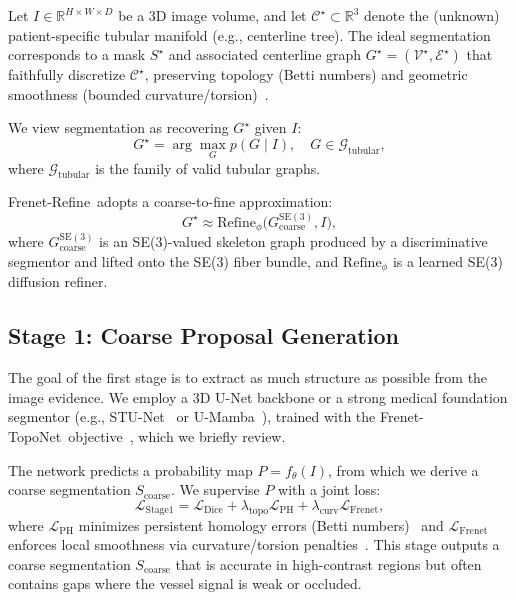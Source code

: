 \documentclass{article}
\newcommand{\SE}[1]{\mathrm{SE}(#1)}
\newcommand{\modelname}{Frenet-Refine}
\newcommand{\stageone}{Frenet-TopoNet}
\begin{document}
Let $I \in \mathbb{R}^{H \times W \times D}$ be a 3D image volume, and let $\mathcal{C}^\star \subset \mathbb{R}^3$ denote the (unknown) patient-specific tubular manifold (e.g., centerline tree). The ideal segmentation corresponds to a mask $S^\star$ and associated centerline graph $G^\star = (\mathcal{V}^\star, \mathcal{E}^\star)$ that faithfully discretize $\mathcal{C}^\star$, preserving topology (Betti numbers) and geometric smoothness (bounded curvature/torsion)~\cite{docarmo2016differential,bergou2008discrete}.

We view segmentation as recovering $G^\star$ given $I$:
\begin{equation}
G^\star = \arg\max_G p(G \mid I), \quad G \in \mathcal{G}_{\text{tubular}},
\end{equation}
where $\mathcal{G}_{\text{tubular}}$ is the family of valid tubular graphs.

\modelname\ adopts a coarse-to-fine approximation:
\begin{equation}
  G^\star \approx \mathrm{Refine}_\phi \big(G^{\SE{3}}_{\text{coarse}}, I \big),
\end{equation}
where $G^{\SE{3}}_{\text{coarse}}$ is an SE(3)-valued skeleton graph produced by a discriminative segmentor and lifted onto the SE(3) fiber bundle, and $\mathrm{Refine}_\phi$ is a learned SE(3) diffusion refiner.

\subsection{Stage 1: Coarse Proposal Generation}

The goal of the first stage is to extract as much structure as possible from the image evidence. We employ a 3D U-Net backbone or a strong medical foundation segmentor (e.g., STU-Net~\cite{huang2024stu} or U-Mamba~\cite{ma2024umamba}), trained with the \stageone\ objective~\cite{anonymous_ijcai}, which we briefly review.

The network predicts a probability map $P = f_\theta(I)$, from which we derive a coarse segmentation $S_{\text{coarse}}$. We supervise $P$ with a joint loss:
\begin{equation}
    \mathcal{L}_{\text{Stage1}} = \mathcal{L}_{\text{Dice}} 
    + \lambda_{\text{topo}} \mathcal{L}_{\text{PH}} 
    + \lambda_{\text{curv}} \mathcal{L}_{\text{Frenet}},
\end{equation}
where $\mathcal{L}_{\text{PH}}$ minimizes persistent homology errors (Betti numbers)~\cite{clough2020topological,hu2021topoloss} and $\mathcal{L}_{\text{Frenet}}$ enforces local smoothness via curvature/torsion penalties~\cite{su2022frenet,anonymous_ijcai}. This stage outputs a coarse segmentation $S_{\text{coarse}}$ that is accurate in high-contrast regions but often contains gaps where the vessel signal is weak or occluded.
\end{document}
